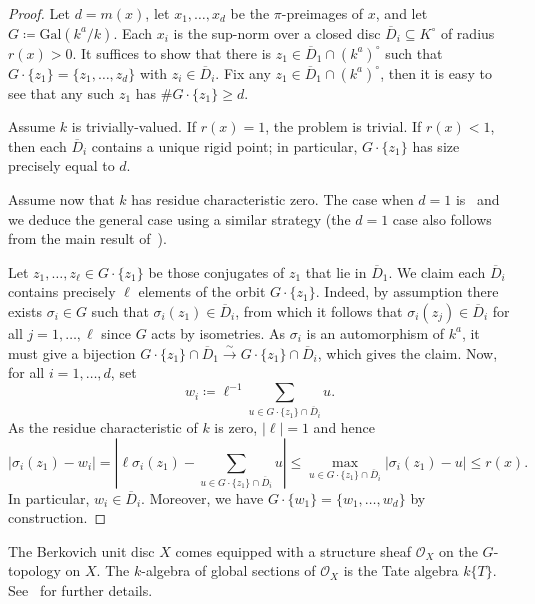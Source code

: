 \documentclass[10pt,reqno]{amsart}
\theoremstyle{plain}
\theoremstyle{definition}
\numberwithin{equation}{section}
\renewcommand{\O}{\mathcal{O}}
\newcommand{\Gal}{\textrm{Gal}}
\begin{document}
\begin{proof}
Let $d = m(x)$, let $x_{1},\ldots,x_{d}$ be the $\pi$-preimages of $x$, and let $G \coloneqq \Gal(k^a/k)$.
Each $x_i$ is the sup-norm over a closed disc $\overline{D}_i \subseteq K^{\circ}$ of radius $r(x) > 0$. 
It suffices to show that there is $z_1 \in \overline{D}_1 \cap (k^a)^{\circ}$ such that $G \cdot \{ z_1 \}  = \{ z_1,\ldots, z_d \}$ with $z_i \in \overline{D}_i$. 
Fix any $z_1 \in \overline{D}_1 \cap (k^a)^{\circ}$, then it is easy to see that any such $z_1$ has $\# G \cdot \{ z_1 \} \geq d$. 

Assume $k$ is trivially-valued. If $r(x) = 1$, the problem is trivial. If $r(x) < 1$, then each $\overline{D}_i$ contains a unique rigid point; in particular, $G \cdot \{ z_1 \}$ has size precisely equal to $d$.

Assume now that $k$ has residue characteristic zero. The case when $d=1$ is~\cite[Proposition 2']{ax-zeros} and we deduce the general case using a similar strategy (the $d=1$ case also follows from the main result of~\cite{schmidt}).

Let $z_1,\ldots,z_{\ell} \in G \cdot \{ z_1 \}$ be those conjugates of $z_1$ that lie in $\overline{D}_1$. We claim each $\overline{D}_i$ contains precisely $\ell$ elements of the orbit $G \cdot \{ z_1 \}$. 
Indeed, by assumption there exists $\sigma_i \in G$ such that $\sigma_i(z_1) \in \overline{D}_i$, from which it follows that $\sigma_i(z_j) \in \overline{D}_i$ for all $j=1,\ldots,\ell$ since $G$ acts by isometries. As $\sigma_i$ is an automorphism of $k^a$, it must give a bijection $G \cdot \{ z_1 \} \cap \overline{D}_1 \stackrel{\sim}{\to} G \cdot \{ z _1 \} \cap \overline{D}_i$, which gives the claim.
Now, for all $i=1,\ldots,d$, set
$$
w_i \coloneqq \ell^{-1} \sum_{u \in G \cdot \{ z_1 \} \cap \overline{D}_i} u.
$$
As the residue characteristic of $k$ is zero,  $|\ell | = 1$ and hence
$$
|\sigma_i(z_1) - w_i| = \left| \ell \sigma_i(z_1) - \sum_{u \in G \cdot \{ z_1 \} \cap \overline{D}_i } u \right| \leq \max_{u \in G \cdot \{ z_1 \} \cap \overline{D}_i } |\sigma_i(z_1) - u| \leq r(x).
$$
In particular, $w_i \in \overline{D}_i$. Moreover, we have $G \cdot \{ w_1 \} = \{ w_1,\ldots, w_d \}$ by construction.
\end{proof}

The Berkovich unit disc $X$ comes equipped with a structure sheaf $\O_X$ on the $G$-topology on $X$. The $k$-algebra of global sections of $\O_X$ is the Tate algebra $k\{ T \}$. See~\cite[2.3]{berkovich} for further details.
\end{document}

